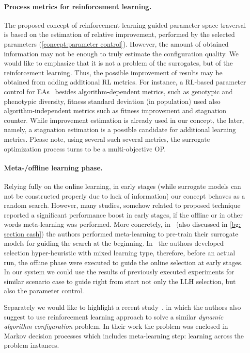 \paragraph{Process metrics for reinforcement learning.} The proposed concept of reinforcement learning-guided parameter space traversal is based on the estimation of relative improvement, performed by the selected parameters (\cref{concept:parameter control}). However, the amount of obtained information may not be enough to truly estimate the configuration quality. We would like to emphasize that it is not a problem of the surrogates, but of the reinforcement learning. Thus, the possible improvement of results may be obtained from adding additional RL metrics. For instance, a RL-based parameter control for EAs~\cite{karafotias2014generic} besides algorithm-dependent metrics, such as genotypic and phenotypic diversity, fitness standard deviation (in population) used also algorithm-independent metrics such as fitness improvement and stagnation counter. While improvement estimation is already used in our concept, the later, namely, a stagnation estimation is a possible candidate for additional learning metrics. Please note, using several such several metrics, the surrogate optimization process turns to be a multi-objective OP.


\paragraph{Meta-/offline learning phase.} Relying fully on the online learning, in early stages (while surrogate models can not be constructed properly due to lack of information) our concept behaves as a random search. However, many studies, somehow related to proposed technique reported a significant performance boost in early stages, if the offline or in other words meta-learning was performed. More concretely, in~\cite{feurer2015efficient} (also discussed in \cref{bg: section cash}) the authors performed meta-learning to pre-train their surrogate models for guiding the search at the beginning. In~\cite{uludaug2013hybrid} the authors developed selection hyper-heuristic with mixed learning type, therefore, before an actual run, the offline phase were executed to guide the online selection at early stages. In our system we could use the results of previously executed experiments for similar scenario case to guide right from start not only the LLH selection, but also the parameter control. 

Separately we would like to highlight a recent study~\cite{biedenkapp-ecai20}, in which the authors also suggest to use reinforcement learning approach to solve a similar \emph{dynamic algorithm configuration} problem. In their work the problem was enclosed in Markov decision processes which includes meta-learning step: learning across the problem instances.


